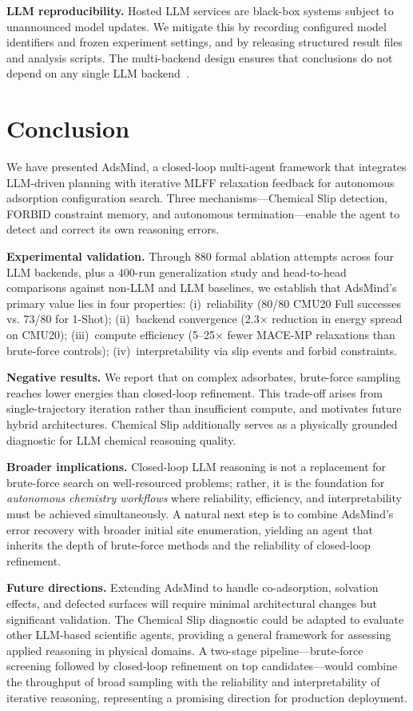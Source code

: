 \textbf{LLM reproducibility.}
Hosted LLM services are black-box systems subject to unannounced model updates.
We mitigate this by recording configured model identifiers and frozen experiment settings, and by releasing structured result files and analysis scripts.
The multi-backend design ensures that conclusions do not depend on any single LLM backend~\cite{alfred2026data,huang2026towards}.


\section{Conclusion}

We have presented AdsMind, a closed-loop multi-agent framework that integrates LLM-driven planning with iterative MLFF relaxation feedback for autonomous adsorption configuration search.
Three mechanisms---Chemical Slip detection, FORBID constraint memory, and autonomous termination---enable the agent to detect and correct its own reasoning errors.

\textbf{Experimental validation.}
Through 880 formal ablation attempts across four LLM backends, plus a 400-run generalization study and head-to-head comparisons against non-LLM and LLM baselines, we establish that AdsMind's primary value lies in four properties:
(i)~reliability (80/80 CMU20 Full successes vs. 73/80 for 1-Shot);
(ii)~backend convergence (2.3$\times$ reduction in energy spread on CMU20);
(iii)~compute efficiency (5--25$\times$ fewer MACE-MP relaxations than brute-force controls);
(iv)~interpretability via slip events and forbid constraints.

\textbf{Negative results.}
We report that on complex adsorbates, brute-force sampling reaches lower energies than closed-loop refinement.
This trade-off arises from single-trajectory iteration rather than insufficient compute, and motivates future hybrid architectures.
Chemical Slip additionally serves as a physically grounded diagnostic for LLM chemical reasoning quality.

\textbf{Broader implications.}
Closed-loop LLM reasoning is not a replacement for brute-force search on well-resourced problems; rather, it is the foundation for \textit{autonomous chemistry workflows} where reliability, efficiency, and interpretability must be achieved simultaneously.
A natural next step is to combine AdsMind's error recovery with broader initial site enumeration, yielding an agent that inherits the depth of brute-force methods and the reliability of closed-loop refinement.

\textbf{Future directions.}
Extending AdsMind to handle co-adsorption, solvation effects, and defected surfaces will require minimal architectural changes but significant validation.
The Chemical Slip diagnostic could be adapted to evaluate other LLM-based scientific agents, providing a general framework for assessing applied reasoning in physical domains.
A two-stage pipeline---brute-force screening followed by closed-loop refinement on top candidates---would combine the throughput of broad sampling with the reliability and interpretability of iterative reasoning, representing a promising direction for production deployment.
